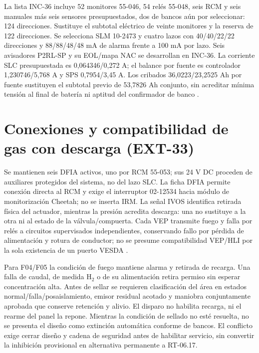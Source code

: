 La lista INC-36 incluye 52 monitores 55-046, 54 relés 55-048, seis RCM y seis manuales más seis sensores presupuestados, dos de bancos aún por seleccionar: 124 direcciones. Sustituye el subtotal eléctrico de veinte monitores y la reserva de 122 direcciones. Se selecciona SLM 10-2473 y cuatro lazos con 40/40/22/22 direcciones y 88/88/48/48 mA de alarma frente a 100 mA por lazo. Seis avisadores P2RL-SP y su EOL/mapa NAC se desarrollan en INC-36. La corriente SLC presupuestada es 0,064346/0,272 A; el balance por fuente es controlador 1,230746/5,768 A y SPS 0,7954/3,45 A. Los cribados 36,0223/23,2525 Ah por fuente sustituyen el subtotal previo de 53,7826 Ah conjunto, sin acreditar mínima tensión al final de batería ni aptitud del confirmador de banco \parencite[ap.~A, secciones~1--3]{lote33-cheetah11}.

\section{Conexiones y compatibilidad de gas con descarga (EXT-33)}
\label{sec:sd4-ext33}
Se mantienen seis DFIA activos, uno por RCM 55-053; sus 24 V DC proceden de auxiliares protegidos del sistema, no del lazo SLC. La ficha DFIA permite conexión directa al RCM y exige el interruptor 02-12534 hacia módulo de monitorización Cheetah; no se inserta IRM. La señal IVOS identifica retirada física del actuador, mientras la presión acredita descarga: una no sustituye a la otra ni al estado de la válvula/compuerta. Cada VEP transmite fuego y falla por relés a circuitos supervisados independientes, conservando fallo por pérdida de alimentación y rotura de conductor; no se presume compatibilidad VEP/HLI por la sola existencia de un puerto VESDA \parencite[ficha~06-432-1-5-DF, pp.~5--6]{lote30-fike542}\parencite[secs.~3.8 y 4]{lote33-cheetah11}.

Para F04/F05 la condición de fuego mantiene alarma y retirada de recarga. Una falla de caudal, de medida H$_2$ o de su alimentación retira permiso sin esperar concentración alta. Antes de sellar se requieren clasificación del área en estados normal/falla/posaislamiento, emisor residual acotado y maniobra conjuntamente aprobada que conserve retención y alivio. El disparo no habilita recarga, ni el rearme del panel la repone. Mientras la condición de sellado no esté resuelta, no se presenta el diseño como extinción automática conforme de bancos. El conflicto exige cerrar diseño y cadena de seguridad antes de habilitar servicio, sin convertir la inhibición provisional en alternativa permanente a RT-06.17.

